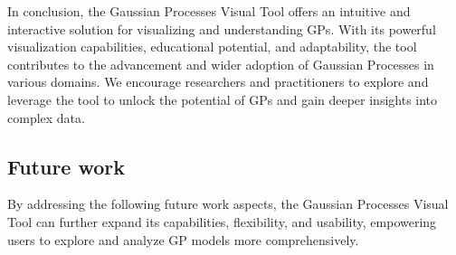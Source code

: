 \documentclass[preprint,journal]{vgtc}       %
\begin{document}
In conclusion, the Gaussian Processes Visual Tool offers an intuitive and interactive solution for visualizing and understanding GPs. With its powerful visualization capabilities, educational potential, and adaptability, the tool contributes to the advancement and wider adoption of Gaussian Processes in various domains. We encourage researchers and practitioners to explore and leverage the tool to unlock the potential of GPs and gain deeper insights into complex data.


\subsection{Future work}

By addressing the following future work aspects, the Gaussian Processes Visual Tool can further expand its capabilities, flexibility, and usability, empowering users to explore and analyze GP models more comprehensively.
\end{document}
